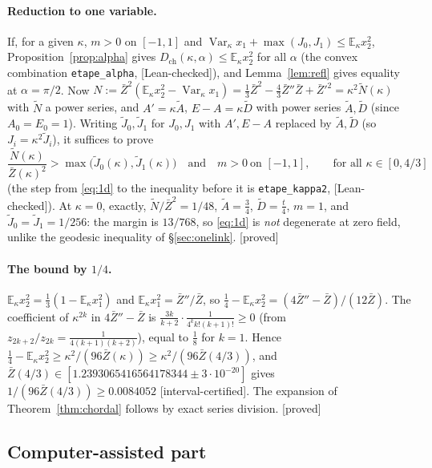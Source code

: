 \documentclass[11pt,a4paper]{article}
\theoremstyle{remark}
\theoremstyle{definition}
\newcommand{\E}{\mathbb{E}}
\newcommand{\Var}{\operatorname{Var}}
\newcommand{\st}[1]{\textsf{[#1]}}
\newcommand{\Zb}{\bar Z}
\newcommand{\Dch}{D_{\mathrm{ch}}}
\begin{document}
\paragraph{Reduction to one variable.} If, for a given $\kappa$, $m>0$ on $[-1,1]$ and
$\Var_\kappa x_1+\max(J_0,J_1)\le\E_\kappa x_2^2$, Proposition~\ref{prop:alpha} gives $\Dch(\kappa,\alpha)\le\E_\kappa x_2^2$
for all $\alpha$ (the convex combination \texttt{etape\_alpha}, \st{Lean-checked}), and Lemma~\ref{lem:refl} gives
equality at $\alpha=\pi/2$. Now $N:=\Zb^2(\E_\kappa x_2^2-\Var_\kappa x_1)=\frac13\Zb^2-\frac43\Zb''\Zb+\Zb'^2=\kappa^2\tilde N(\kappa)$ with
$\tilde N$ a power series, and $A'=\kappa\tilde A$, $E-A=\kappa\tilde D$ with power series $\tilde A,\tilde D$ (since
$A_0=E_0=1$). Writing $\tilde J_0,\tilde J_1$ for $J_0,J_1$ with $A',E-A$ replaced by $\tilde A,\tilde D$ (so
$J_i=\kappa^2\tilde J_i$), it suffices to prove
\begin{equation}\label{eq:1d}
\frac{\tilde N(\kappa)}{\Zb(\kappa)^2}>\max\big(\tilde J_0(\kappa),\tilde J_1(\kappa)\big)\quad\text{and}\quad m>0\ \text{on }[-1,1],
\qquad\text{for all }\kappa\in[0,4/3]
\end{equation}
(the step from \eqref{eq:1d} to the inequality before it is \texttt{etape\_kappa2}, \st{Lean-checked}). At $\kappa=0$,
exactly, $\tilde N/\Zb^2=1/48$, $\tilde A=\frac34$, $\tilde D=\frac t4$, $m=1$, and $\tilde J_0=\tilde J_1=1/256$: the
margin is $13/768$, so \eqref{eq:1d} is \emph{not} degenerate at zero field, unlike the geodesic inequality of
\S\ref{sec:onelink}. \st{proved}

\paragraph{The bound by $1/4$.} $\E_\kappa x_2^2=\frac13(1-\E_\kappa x_1^2)$ and $\E_\kappa x_1^2=\Zb''/\Zb$, so
$\frac14-\E_\kappa x_2^2=(4\Zb''-\Zb)/(12\Zb)$. The coefficient of $\kappa^{2k}$ in $4\Zb''-\Zb$ is
$\frac{3k}{k+2}\cdot\frac{1}{4^kk!(k+1)!}\ge0$ (from $z_{2k+2}/z_{2k}=\frac1{4(k+1)(k+2)}$), equal to $\frac18$ for
$k=1$. Hence $\frac14-\E_\kappa x_2^2\ge\kappa^2/(96\Zb(\kappa))\ge\kappa^2/(96\Zb(4/3))$, and
$\Zb(4/3)\in[1.2393065416564178344\pm3\cdot10^{-20}]$ gives $1/(96\Zb(4/3))\ge0.0084052$ \st{interval-certified}.
The expansion of Theorem~\ref{thm:chordal} follows by exact series division. \st{proved}

\subsection{Computer-assisted part}\label{sec:chcap}
\end{document}
